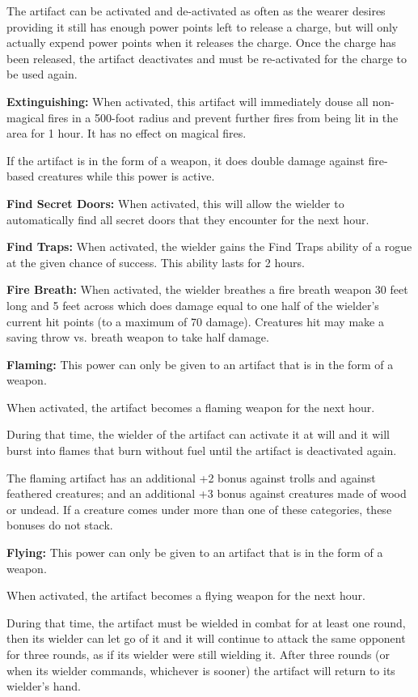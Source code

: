 \begin{multicols*}{2}
The artifact can be activated and de-activated as often as the wearer desires providing it still has enough power points left to release a charge, but will only actually expend power points when it releases the charge. Once the charge has been released, the artifact deactivates and must be re-activated for the charge to be used again.

\textbf{Extinguishing:} When activated, this artifact will immediately douse all non-magical fires in a 500-foot radius and prevent further fires from being lit in the area for 1 hour. It has no effect on magical fires.

If the artifact is in the form of a weapon, it does double damage against fire-based creatures while this power is active.

\textbf{Find Secret Doors:} When activated, this will allow the wielder to automatically find all secret doors that they encounter for the next hour.

\textbf{Find Traps:} When activated, the wielder gains the Find Traps ability of a rogue at the given chance of success. This ability lasts for 2 hours.

\textbf{Fire Breath:} When activated, the wielder breathes a fire breath weapon 30 feet long and 5 feet across which does damage equal to one half of the wielder’s current hit points (to a maximum of 70 damage). Creatures hit may make a saving throw vs. breath weapon to take half damage.

\textbf{Flaming:} This power can only be given to an artifact that is in the form of a weapon.

When activated, the artifact becomes a flaming weapon for the next hour.

During that time, the wielder of the artifact can activate it at will and it will burst into flames that burn without fuel until the artifact is deactivated again.

The flaming artifact has an additional +2 bonus against trolls and against feathered creatures; and an additional +3 bonus against creatures made of wood or undead. If a creature comes under more than one of these categories, these bonuses do not stack.

\textbf{Flying:} This power can only be given to an artifact that is in the form of a weapon.

When activated, the artifact becomes a flying weapon for the next hour.

During that time, the artifact must be wielded in combat for at least one round, then its wielder can let go of it and it will continue to attack the same opponent for three rounds, as if its wielder were still wielding it. After three rounds (or when its wielder commands, whichever is sooner) the artifact will return to its wielder’s hand.


\end{multicols*}
